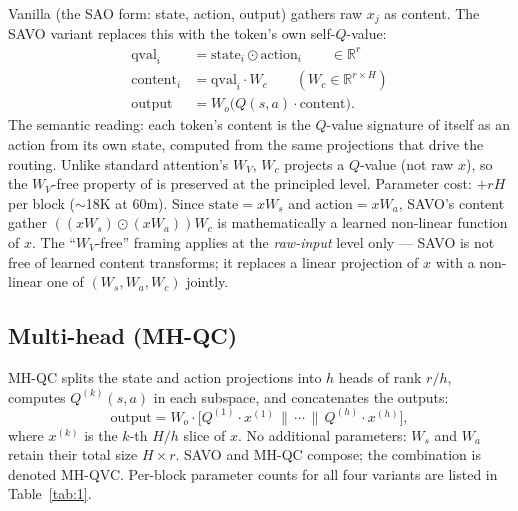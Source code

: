 Vanilla \QC{} (the SAO form: state, action, output) gathers raw $x_j$ as content. The SAVO variant replaces this with the token's own self-$Q$-value:
\begin{align}
\text{qval}_i &= \text{state}_i \odot \text{action}_i \qquad \in \mathbb{R}^{r} \label{eq:1}\\
\text{content}_i &= \text{qval}_i \cdot W_c \qquad (W_c \in \mathbb{R}^{r\times H}) \label{eq:2}\\
\text{output} &= W_o\bigl(Q(s,a)\cdot \text{content}\bigr). \label{eq:3}
\end{align}
The semantic reading: each token's content is the $Q$-value signature of itself as an action from its own state, computed from the same projections that drive the routing. Unlike standard attention's $W_V$, $W_c$ projects a $Q$-value (not raw $x$), so the $W_V$-free property of \QC{} is preserved at the principled level. Parameter cost: $+rH$ per block (${\sim}$18K at 60m). Since $\text{state} = xW_s$ and $\text{action} = xW_a$, SAVO's content gather $((xW_s)\odot(xW_a))W_c$ is mathematically a learned non-linear function of $x$. The ``$W_V$-free'' framing applies at the \textit{raw-input} level only --- SAVO is not free of learned content transforms; it replaces a linear projection of $x$ with a non-linear one of $(W_s, W_a, W_c)$ jointly.

\subsection{Multi-head \QC{} (MH-QC)}\label{sec:3.2}

MH-QC splits the state and action projections into $h$ heads of rank $r/h$, computes $Q^{(k)}(s,a)$ in each subspace, and concatenates the outputs:
\begin{equation}
\text{output} = W_o \cdot \bigl[Q^{(1)}\cdot x^{(1)} \,\|\, \cdots \,\|\, Q^{(h)}\cdot x^{(h)}\bigr], \label{eq:4}
\end{equation}
where $x^{(k)}$ is the $k$-th $H/h$ slice of $x$. No additional parameters: $W_s$ and $W_a$ retain their total size $H\times r$. SAVO and MH-QC compose; the combination is denoted MH-QVC. Per-block parameter counts for all four variants are listed in Table~\ref{tab:1}.


